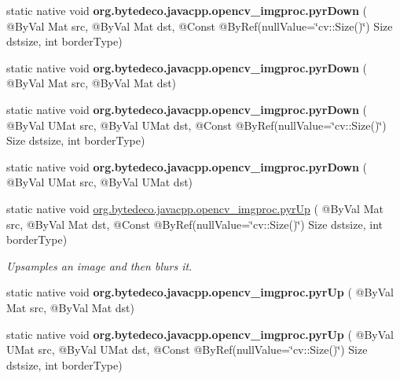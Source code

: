 \begin{DoxyCompactItemize}
static native void {\bfseries org.\+bytedeco.\+javacpp.\+opencv\+\_\+imgproc.\+pyr\+Down} ( @By\+Val Mat src, @By\+Val Mat dst, @Const @By\+Ref(null\+Value=\char`\"{}cv\+::\+Size()\char`\"{}) Size dstsize, int border\+Type)
\item 
\mbox{\label{group__imgproc__filter_ga6167f0b3199c77f153568fef1ec87d40}} 
static native void {\bfseries org.\+bytedeco.\+javacpp.\+opencv\+\_\+imgproc.\+pyr\+Down} ( @By\+Val Mat src, @By\+Val Mat dst)
\item 
\mbox{\label{group__imgproc__filter_ga12e2b2a852d66ee84fc6f8f12bd1595d}} 
static native void {\bfseries org.\+bytedeco.\+javacpp.\+opencv\+\_\+imgproc.\+pyr\+Down} ( @By\+Val U\+Mat src, @By\+Val U\+Mat dst, @Const @By\+Ref(null\+Value=\char`\"{}cv\+::\+Size()\char`\"{}) Size dstsize, int border\+Type)
\item 
\mbox{\label{group__imgproc__filter_ga009cea20a2927a644c664d67064ce059}} 
static native void {\bfseries org.\+bytedeco.\+javacpp.\+opencv\+\_\+imgproc.\+pyr\+Down} ( @By\+Val U\+Mat src, @By\+Val U\+Mat dst)
\item 
static native void \hyperlink{group__imgproc__filter_ga3fc37612b218d8cee2f4b099a8d0a2aa}{org.\+bytedeco.\+javacpp.\+opencv\+\_\+imgproc.\+pyr\+Up} ( @By\+Val Mat src, @By\+Val Mat dst, @Const @By\+Ref(null\+Value=\char`\"{}cv\+::\+Size()\char`\"{}) Size dstsize, int border\+Type)
\begin{DoxyCompactList}\small\item\em Upsamples an image and then blurs it. \end{DoxyCompactList}\item 
\mbox{\label{group__imgproc__filter_ga55da6cb1d91eb7a7504e550a0ac6e3d3}} 
static native void {\bfseries org.\+bytedeco.\+javacpp.\+opencv\+\_\+imgproc.\+pyr\+Up} ( @By\+Val Mat src, @By\+Val Mat dst)
\item 
\mbox{\label{group__imgproc__filter_ga03cf4a3c424de015336497afb357f094}} 
static native void {\bfseries org.\+bytedeco.\+javacpp.\+opencv\+\_\+imgproc.\+pyr\+Up} ( @By\+Val U\+Mat src, @By\+Val U\+Mat dst, @Const @By\+Ref(null\+Value=\char`\"{}cv\+::\+Size()\char`\"{}) Size dstsize, int border\+Type)
\item 

\end{DoxyCompactItemize}
